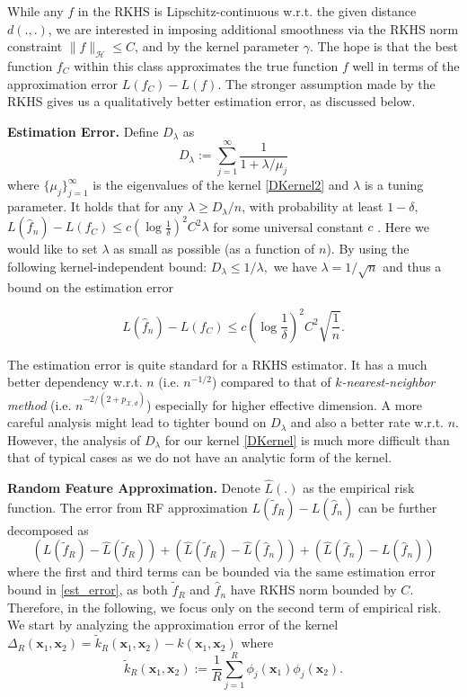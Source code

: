 \documentclass{article}
\newcommand{\X}{\mathcal{X}}
\newcommand{\1}{\mathbf{1}}
\newcommand{\bx}{\boldsymbol{x}}
\newcommand{\cH}{\mathcal{H}}
\newcommand{\hf}{\hat{f}}
\newcommand{\tk}{\tilde{k}}
\begin{document}
While any $f$ in the RKHS is Lipschitz-continuous w.r.t. the given distance $d(.,.)$, we are interested in imposing additional smoothness via the RKHS norm constraint $\|f\|_{\cH}\leq C$, and by the kernel parameter $\gamma$. The hope is that the best function $f_C$ within this class approximates the true function $f$ well in terms of the approximation error
$
L(f_C)-L(f).
$
The stronger assumption made by the RKHS gives us a qualitatively better estimation error, as discussed below.

\textbf{Estimation Error.}
Define $D_{\lambda}$ as
$$
D_{\lambda}:=\sum_{j=1}^{\infty} \frac{1}{1+\lambda/\mu_j}
$$
where $\{\mu_j\}_{j=1}^{\infty}$ is the eigenvalues of the kernel \eqref{DKernel2} and $\lambda$ is a tuning parameter. It holds that for any $\lambda\geq D_{\lambda}/n$, with probability at least $1-\delta$,
$
L(\hf_n)-L(f_C) \leq c(\log\frac{1}{\delta})^2C^2 \lambda
$
for some universal constant $c$ \cite{zhang2005learning}. Here we would like to set $\lambda$ as small as possible (as a function of $n$). By using the following kernel-independent bound:
$
D_{\lambda} \leq 1/\lambda,
$
we have $\lambda=1/\sqrt{n}$ and thus a bound on the estimation error

\begin{equation}\label{est_error}
L(\hf_n)-L(f_C) \leq c(\log\frac{1}{\delta})^2C^2 \sqrt{\frac{1}{n}}.
\end{equation}

The estimation error is quite standard for a RKHS estimator. It has a much better dependency w.r.t. $n$ (i.e. $n^{-1/2}$) compared to that of \emph{$k$-nearest-neighbor method} (i.e. $n^{-2/(2+p_{\X,d})}$) especially for higher effective dimension. A more careful analysis might lead to tighter bound on $D_{\lambda}$ and also a better rate w.r.t. $n$. However, the analysis of $D_{\lambda}$ for our kernel \eqref{DKernel} is much more difficult than that of typical cases as we do not have an analytic form of the kernel. 

\textbf{Random Feature Approximation.}
Denote $\hat L(.)$ as the empirical risk function. The error from RF approximation $L(\tilde f_R)-L(\hat f_n)$ can be further decomposed as 
$$
(L(\tilde f_R)-\hat L(\tilde f_R)) + (\hat L(\tilde f_R)-\hat L(\hat f_n)) + (\hat L(\hat f_n)-L(\hat f_n))
$$
where the first and third terms can be bounded via the same estimation error bound in \eqref{est_error}, as both $\tilde f_R$ and $\hat f_n$ have RKHS norm bounded by $C$. Therefore, in the following, we focus only on the second term of empirical risk. We start by analyzing the approximation error of the kernel
$
\Delta_R(\bx_1,\bx_2)=\tk_R(\bx_1,\bx_2)-k(\bx_1,\bx_2)
$
where
\begin{equation}\label{RF}
\tk_R(\bx_1,\bx_2):=\frac{1}{R}\sum_{j=1}^R \phi_j(\bx_1)\phi_j(\bx_2).
\end{equation}
\end{document}
